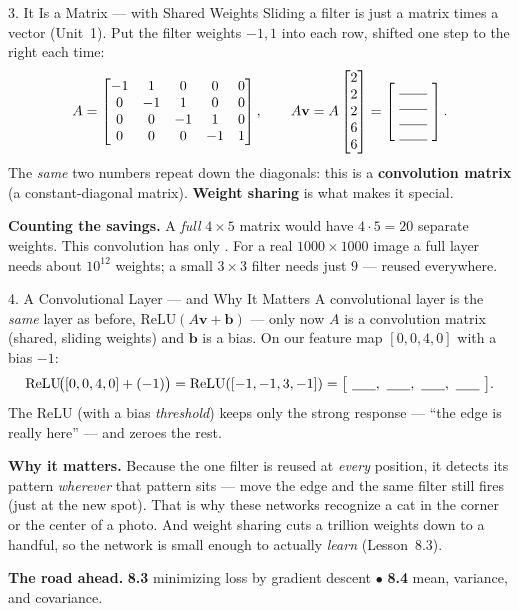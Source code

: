 \documentclass[10pt]{article}
\newcommand{\vv}{\mathbf{v}}
\newcommand{\bb}{\mathbf{b}}
\newcommand{\relu}{\mathrm{ReLU}}
\begin{document}
\begin{notesbox}{3. It Is a Matrix --- with Shared Weights}
Sliding a filter is just a matrix times a vector (Unit~1). Put the filter weights $-1,1$ into each row,
shifted one step to the right each time:
\[
  A=\begin{bmatrix} -1 & 1 & 0 & 0 & 0\\ 0 & -1 & 1 & 0 & 0\\ 0 & 0 & -1 & 1 & 0\\ 0 & 0 & 0 & -1 & 1 \end{bmatrix},
  \qquad A\vv = A\begin{bmatrix}2\\2\\2\\6\\6\end{bmatrix}=\begin{bmatrix}\ \blank{0.7cm}\ \\[-1pt] \blank{0.7cm}\\[-1pt] \blank{0.7cm}\\[-1pt] \blank{0.7cm}\end{bmatrix}.
\]
The \emph{same} two numbers repeat down the diagonals: this is a \textbf{convolution matrix} (a
constant-diagonal matrix). \textbf{Weight sharing} is what makes it special.

\vspace{2pt}
\textbf{Counting the savings.} A \emph{full} $4\times5$ matrix would have $4\cdot 5=20$ separate weights. This
convolution has only \blank{1.1cm}. For a real $1000\times1000$ image a full layer needs about $10^{12}$
weights; a small $3\times3$ filter needs just $9$ --- reused everywhere.
\end{notesbox}

\begin{notesbox}{4. A Convolutional Layer --- and Why It Matters}
A convolutional layer is the \emph{same} layer as before, $\relu(A\vv+\bb)$ --- only now $A$ is a
convolution matrix (shared, sliding weights) and $\bb$ is a bias. On our feature map $[0,0,4,0]$ with a bias
$-1$:
\[
  \relu\!\big([0,0,4,0]+(-1)\big)=\relu([-1,-1,3,-1])=\big[\ \blank{0.6cm},\ \blank{0.6cm},\ \blank{0.6cm},\ \blank{0.6cm}\ \big].
\]
The ReLU (with a bias \emph{threshold}) keeps only the strong response --- ``the edge is really here'' --- and
zeroes the rest.

\vspace{2pt}
\textbf{Why it matters.} Because the one filter is reused at \emph{every} position, it detects its pattern
\emph{wherever} that pattern sits --- move the edge and the same filter still fires (just at the new spot).
That is why these networks recognize a cat in the corner or the center of a photo. And weight sharing cuts a
trillion weights down to a handful, so the network is small enough to actually \emph{learn} (Lesson~8.3).

\vspace{2pt}
\textbf{The road ahead.} \textbf{8.3} minimizing loss by gradient descent\; $\bullet$\; \textbf{8.4} mean,
variance, and covariance.
\end{notesbox}
\end{document}

